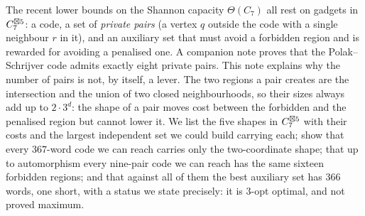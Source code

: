 The recent lower bounds on the Shannon capacity $\Theta(C_7)$ all rest on gadgets in
$C_7^{\boxtimes 5}$: a code, a set of \emph{private pairs} (a vertex $q$ outside the code with a
single neighbour $r$ in it), and an auxiliary set that must avoid a forbidden region and is
rewarded for avoiding a penalised one. A companion note proves that the Polak--Schrijver code
admits exactly eight private pairs. This note explains why the number of pairs is not, by
itself, a lever. The two regions a pair creates are the intersection and the union of two
closed neighbourhoods, so their sizes always add up to $2\cdot 3^d$: the shape of a pair moves
cost between the forbidden and the penalised region but cannot lower it. We list the five shapes
in $C_7^{\boxtimes 5}$ with their costs and the largest independent set we could build carrying each;
show that every $367$-word code we can reach carries only the two-coordinate shape; that up to
automorphism every nine-pair code we can reach has the same sixteen forbidden regions; and that
against all of them the best auxiliary set has $366$ words, one short, with a status we state
precisely: it is $3$-opt optimal, and not proved maximum.
